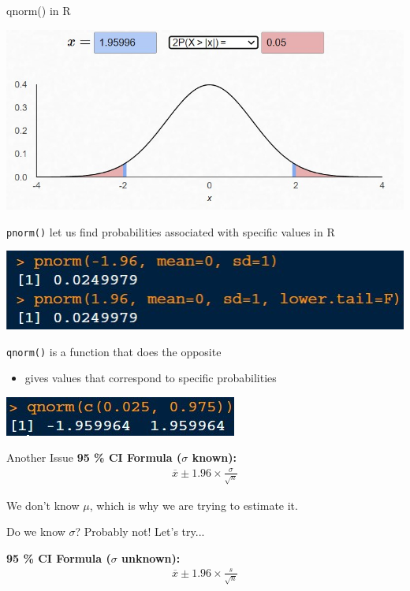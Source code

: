 \documentclass{beamer}
\begin{document}
\begin{frame}{qnorm() in R}
\begin{center}
\includegraphics[scale=.5]{img/normal_95ci2.jpg}
\end{center}
\scriptsize
\texttt{pnorm()} let us find probabilities associated with specific values in R
 \vspace{1mm}
 
\includegraphics[scale=.9]{img/pnorm.jpg} \vspace{4mm}

\texttt{qnorm()} is a function that does the opposite
\begin{itemize}
    \item gives values that correspond to specific probabilities
\end{itemize}
\includegraphics[scale=.9]{img/qnorm1.jpg}

\end{frame}

\begin{frame}{Another Issue}
\textbf{95 \% CI Formula ($\sigma$ known):}
\begin{align*}
\overline{x} \pm 1.96 \times \frac{\sigma}{\sqrt{n}}
\end{align*} \vspace{10mm}

We don't know $\mu$, which is why we are trying to estimate it. \vspace{2mm}

Do we know $\sigma$? Probably not! Let's try... \vspace{10mm}

\textbf{95 \% CI Formula ($\sigma$ unknown):}
\begin{align*}
\overline{x} \pm 1.96 \times \frac{s}{\sqrt{n}}
\end{align*}
\end{frame}
\end{document}
